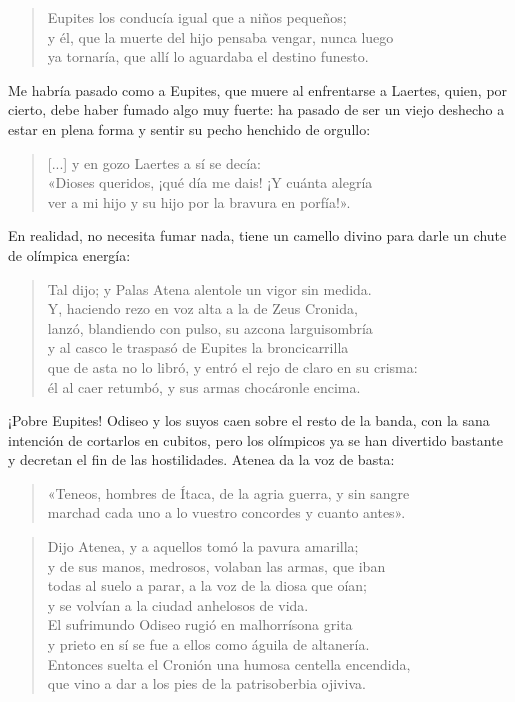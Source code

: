 \begin{verse}
Eupites los conducía igual que a niños pequeños;\\
y él, que la muerte del hijo pensaba vengar, nunca luego\\
ya tornaría, que allí lo aguardaba el destino funesto.
\end{verse}

Me habría pasado como a Eupites, que muere al enfrentarse a Laertes, quien, por cierto, debe haber fumado algo muy fuerte: ha pasado de ser un viejo deshecho a estar en plena forma y sentir su pecho henchido de orgullo:

\begin{verse}
[...] y en gozo Laertes a sí se decía:\\
«Dioses queridos, ¡qué día me dais! ¡Y cuánta alegría\\
ver a mi hijo y su hijo por la bravura en porfía!».
\end{verse}

En realidad, no necesita fumar nada, tiene un camello divino para darle un chute de olímpica energía:

\begin{verse}
Tal dijo; y Palas Atena alentole un vigor sin medida.\\
Y, haciendo rezo en voz alta a la de Zeus Cronida,\\
lanzó, blandiendo con pulso, su azcona larguisombría\\
y al casco le traspasó de Eupites la broncicarrilla\\
que de asta no lo libró, y entró el rejo de claro en su crisma:\\
él al caer retumbó, y sus armas chocáronle encima.
\end{verse}

¡Pobre Eupites! Odiseo y los suyos caen sobre el resto de la banda, con la sana intención de cortarlos en cubitos, pero los olímpicos ya se han divertido bastante y decretan el fin de las hostilidades. Atenea da la voz de basta:

\begin{verse}
«Teneos, hombres de Ítaca, de la agria guerra, y sin sangre\\
marchad cada uno a lo vuestro concordes y cuanto antes».
\end{verse}

\begin{verse}
Dijo Atenea, y a aquellos tomó la pavura amarilla;\\
y de sus manos, medrosos, volaban las armas, que iban\\
todas al suelo a parar, a la voz de la diosa que oían;\\
y se volvían a la ciudad anhelosos de vida.\\
El sufrimundo Odiseo rugió en malhorrísona grita\\
y prieto en sí se fue a ellos como águila de altanería.\\
Entonces suelta el Cronión una humosa centella encendida,\\
que vino a dar a los pies de la patrisoberbia ojiviva.
\end{verse}

